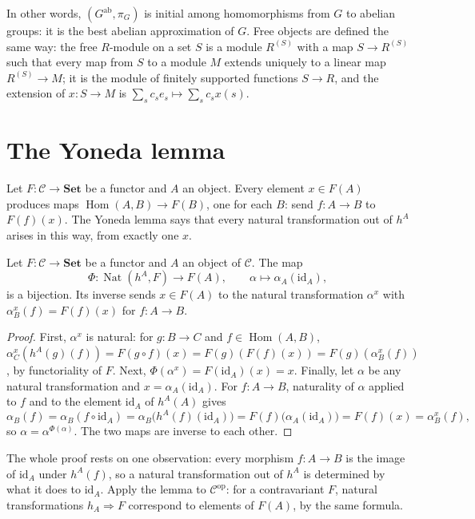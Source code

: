 In other words, $(G^{\mathrm{ab}},\pi_G)$ is initial among homomorphisms from $G$ to abelian groups: it is the best abelian approximation of $G$. Free objects are defined the same way: the free $R$-module on
a set $S$ is a module $R^{(S)}$ with a map $S\to R^{(S)}$ such that every map from $S$ to a module $M$ extends uniquely to a linear map $R^{(S)}\to M$; it is the module of finitely supported functions
$S\to R$, and the extension of $x\colon S\to M$ is $\sum_s c_s e_s\mapsto\sum_s c_s x(s)$.

\section{The Yoneda lemma}

Let $F\colon\mathcal C\to\mathbf{Set}$ be a functor and $A$ an object. Every element $x\in F(A)$ produces maps $\operatorname{Hom}(A,B)\to F(B)$, one for each $B$: send $f\colon A\to B$ to $F(f)(x)$. The Yoneda lemma
says that every natural transformation out of $h^A$ arises in this way, from exactly one $x$.

\begin{theorem}\label{thm:yoneda}
Let $F\colon\mathcal C\to\mathbf{Set}$ be a functor and $A$ an object of $\mathcal C$. The map
\[\Phi\colon\operatorname{Nat}(h^A,F)\to F(A),\qquad\alpha\mapsto\alpha_A(\mathrm{id}_A),\]
is a bijection. Its inverse sends $x\in F(A)$ to the natural transformation $\alpha^x$ with $\alpha^x_B(f)=F(f)(x)$ for $f\colon A\to B$.
\end{theorem}

\begin{proof}
First, $\alpha^x$ is natural: for $g\colon B\to C$ and $f\in\operatorname{Hom}(A,B)$, $\alpha^x_C(h^A(g)(f))=F(g\circ f)(x)=F(g)(F(f)(x))=F(g)(\alpha^x_B(f))$, by functoriality of $F$. Next,
$\Phi(\alpha^x)=F(\mathrm{id}_A)(x)=x$. Finally, let $\alpha$ be any natural transformation and $x=\alpha_A(\mathrm{id}_A)$. For $f\colon A\to B$, naturality of $\alpha$ applied to $f$ and to the element $\mathrm{id}_A$
of $h^A(A)$ gives
\[\alpha_B(f)=\alpha_B(f\circ\mathrm{id}_A)=\alpha_B\bigl(h^A(f)(\mathrm{id}_A)\bigr)=F(f)\bigl(\alpha_A(\mathrm{id}_A)\bigr)=F(f)(x)=\alpha^x_B(f),\]
so $\alpha=\alpha^{\Phi(\alpha)}$. The two maps are inverse to each other.
\end{proof}

The whole proof rests on one observation: every morphism $f\colon A\to B$ is the image of $\mathrm{id}_A$ under $h^A(f)$, so a natural transformation out of $h^A$ is determined by what it does to $\mathrm{id}_A$.
Apply the lemma to $\mathcal C^{\mathrm{op}}$: for a contravariant $F$, natural transformations $h_A\Rightarrow F$ correspond to elements of $F(A)$, by the same formula.

